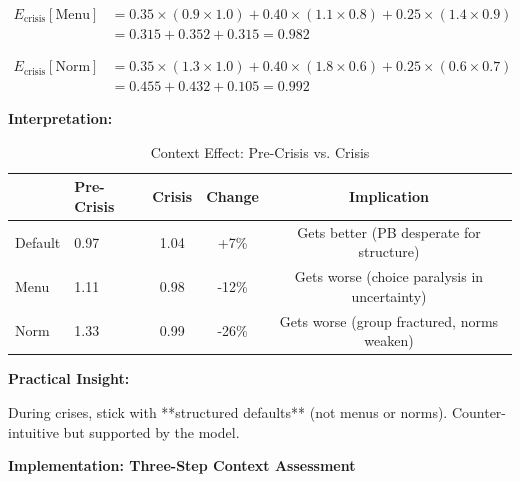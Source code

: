 \begin{equation}
\begin{aligned}
E_{\text{crisis}}[\text{Menu}] &= 0.35 \times (0.9 \times 1.0) + 0.40 \times (1.1 \times 0.8) + 0.25 \times (1.4 \times 0.9)\\
&= 0.315 + 0.352 + 0.315 = 0.982
\end{aligned}
\end{equation}

\begin{equation}
\begin{aligned}
E_{\text{crisis}}[\text{Norm}] &= 0.35 \times (1.3 \times 1.0) + 0.40 \times (1.8 \times 0.6) + 0.25 \times (0.6 \times 0.7)\\
&= 0.455 + 0.432 + 0.105 = 0.992
\end{aligned}
\end{equation}

\textbf{Interpretation:}

\begin{table}[htbp]
\centering
\caption{Context Effect: Pre-Crisis vs. Crisis}
\label{tab:19-context-comparison}
\renewcommand{\arraystretch}{1.3}
\small
\begin{tabular}{@{}llccc@{}}
\toprule
& \textbf{Pre-Crisis} & \textbf{Crisis} & \textbf{Change} & \textbf{Implication} \\
\midrule
Default & 0.97 & 1.04 & +7\% & Gets better (PB desperate for structure) \\
Menu & 1.11 & 0.98 & -12\% & Gets worse (choice paralysis in uncertainty) \\
Norm & 1.33 & 0.99 & -26\% & Gets worse (group fractured, norms weaken) \\
\bottomrule
\end{tabular}
\end{table}

\textbf{Practical Insight:}

During crises, stick with **structured defaults** (not menus or norms). Counter-intuitive but supported by the model.

\textbf{Implementation: Three-Step Context Assessment}

